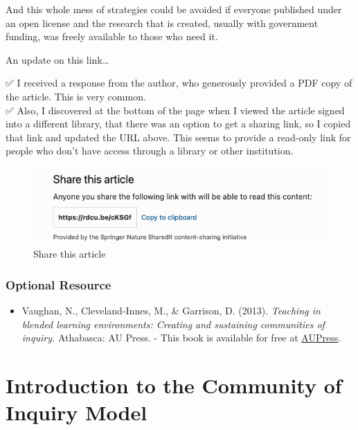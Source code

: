 \documentclass[
]{book}
\providecommand{\tightlist}{%
  \setlength{\itemsep}{0pt}\setlength{\parskip}{0pt}}
\begin{document}
\begin{blank}
And this whole mess of strategies could be avoided if everyone published under an open license and the research that is created, usually with government funding, was freely available to those who need it.

{An update on this link\ldots{}}

✅ I received a response from the author, who generously provided a PDF copy of the article. This is very common.\\
✅ Also, I discovered at the bottom of the page when I viewed the article signed into a different library, that there was an option to get a sharing link, so I copied that link and updated the URL above. This seems to provide a read-only link for people who don't have access through a library or other institution.
\end{blank}

\begin{figure}
\centering
\includegraphics{assets/u2/share.png}
\caption{Share this article}
\end{figure}

\hypertarget{optional-resource}{%
\subsubsection*{Optional Resource}\label{optional-resource}}

\begin{itemize}
\tightlist
\item
  Vaughan, N., Cleveland-Innes, M., \& Garrison, D. (2013). \emph{Teaching in blended learning environments: Creating and sustaining communities of inquiry.} Athabasca: AU Press. - This book is available for free at \href{http://www.aupress.ca/index.php/books/120229}{AUPress}.
\end{itemize}

\hypertarget{introduction-to-the-community-of-inquiry-model}{%
\section{Introduction to the Community of Inquiry Model}\label{introduction-to-the-community-of-inquiry-model}}
\end{document}

